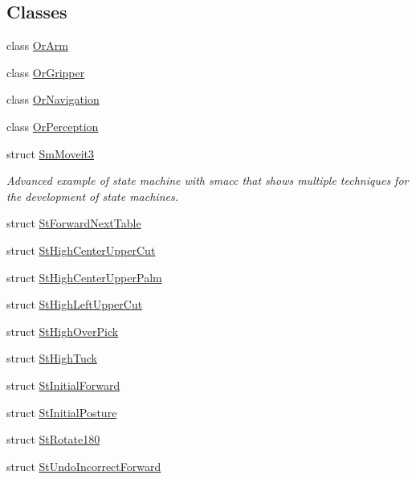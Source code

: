 \subsection*{Classes}
\begin{DoxyCompactItemize}
\item 
class \hyperlink{classsm__moveit__3_1_1OrArm}{Or\+Arm}
\item 
class \hyperlink{classsm__moveit__3_1_1OrGripper}{Or\+Gripper}
\item 
class \hyperlink{classsm__moveit__3_1_1OrNavigation}{Or\+Navigation}
\item 
class \hyperlink{classsm__moveit__3_1_1OrPerception}{Or\+Perception}
\item 
struct \hyperlink{structsm__moveit__3_1_1SmMoveit3}{Sm\+Moveit3}
\begin{DoxyCompactList}\small\item\em Advanced example of state machine with smacc that shows multiple techniques for the development of state machines. \end{DoxyCompactList}\item 
struct \hyperlink{structsm__moveit__3_1_1StForwardNextTable}{St\+Forward\+Next\+Table}
\item 
struct \hyperlink{structsm__moveit__3_1_1StHighCenterUpperCut}{St\+High\+Center\+Upper\+Cut}
\item 
struct \hyperlink{structsm__moveit__3_1_1StHighCenterUpperPalm}{St\+High\+Center\+Upper\+Palm}
\item 
struct \hyperlink{structsm__moveit__3_1_1StHighLeftUpperCut}{St\+High\+Left\+Upper\+Cut}
\item 
struct \hyperlink{structsm__moveit__3_1_1StHighOverPick}{St\+High\+Over\+Pick}
\item 
struct \hyperlink{structsm__moveit__3_1_1StHighTuck}{St\+High\+Tuck}
\item 
struct \hyperlink{structsm__moveit__3_1_1StInitialForward}{St\+Initial\+Forward}
\item 
struct \hyperlink{structsm__moveit__3_1_1StInitialPosture}{St\+Initial\+Posture}
\item 
struct \hyperlink{structsm__moveit__3_1_1StRotate180}{St\+Rotate180}
\item 
struct \hyperlink{structsm__moveit__3_1_1StUndoIncorrectForward}{St\+Undo\+Incorrect\+Forward}
\end{DoxyCompactItemize}
